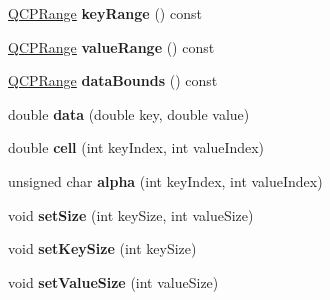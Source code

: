 \begin{DoxyCompactItemize}
\item 
\hyperlink{class_q_c_p_range}{Q\+C\+P\+Range} {\bfseries key\+Range} () const \hypertarget{class_q_c_p_color_map_data_a4765180639742460f64ab6c97c745c08}{}\label{class_q_c_p_color_map_data_a4765180639742460f64ab6c97c745c08}

\item 
\hyperlink{class_q_c_p_range}{Q\+C\+P\+Range} {\bfseries value\+Range} () const \hypertarget{class_q_c_p_color_map_data_a025be4d7ba0494fd7b38a5a56c737f2a}{}\label{class_q_c_p_color_map_data_a025be4d7ba0494fd7b38a5a56c737f2a}

\item 
\hyperlink{class_q_c_p_range}{Q\+C\+P\+Range} {\bfseries data\+Bounds} () const \hypertarget{class_q_c_p_color_map_data_a9ff433248ee226ea0c469ae6cc2489fd}{}\label{class_q_c_p_color_map_data_a9ff433248ee226ea0c469ae6cc2489fd}

\item 
double {\bfseries data} (double key, double value)\hypertarget{class_q_c_p_color_map_data_a2c33807b008cdb9e1394245c294c0eaf}{}\label{class_q_c_p_color_map_data_a2c33807b008cdb9e1394245c294c0eaf}

\item 
double {\bfseries cell} (int key\+Index, int value\+Index)\hypertarget{class_q_c_p_color_map_data_af51ecd21f347adbf87b4cce4e1f5cbd6}{}\label{class_q_c_p_color_map_data_af51ecd21f347adbf87b4cce4e1f5cbd6}

\item 
unsigned char {\bfseries alpha} (int key\+Index, int value\+Index)\hypertarget{class_q_c_p_color_map_data_a4f7e6b7a97017400cbbd46f0660e68ea}{}\label{class_q_c_p_color_map_data_a4f7e6b7a97017400cbbd46f0660e68ea}

\item 
void {\bfseries set\+Size} (int key\+Size, int value\+Size)\hypertarget{class_q_c_p_color_map_data_a0d9ff35c299d0478b682bfbcdd9c097e}{}\label{class_q_c_p_color_map_data_a0d9ff35c299d0478b682bfbcdd9c097e}

\item 
void {\bfseries set\+Key\+Size} (int key\+Size)\hypertarget{class_q_c_p_color_map_data_ac7ef70e383aface34b44dbde49234b6b}{}\label{class_q_c_p_color_map_data_ac7ef70e383aface34b44dbde49234b6b}

\item 
void {\bfseries set\+Value\+Size} (int value\+Size)\hypertarget{class_q_c_p_color_map_data_a0893c9e3914513048b45e3429ffd16f2}{}\label{class_q_c_p_color_map_data_a0893c9e3914513048b45e3429ffd16f2}


\end{DoxyCompactItemize}
